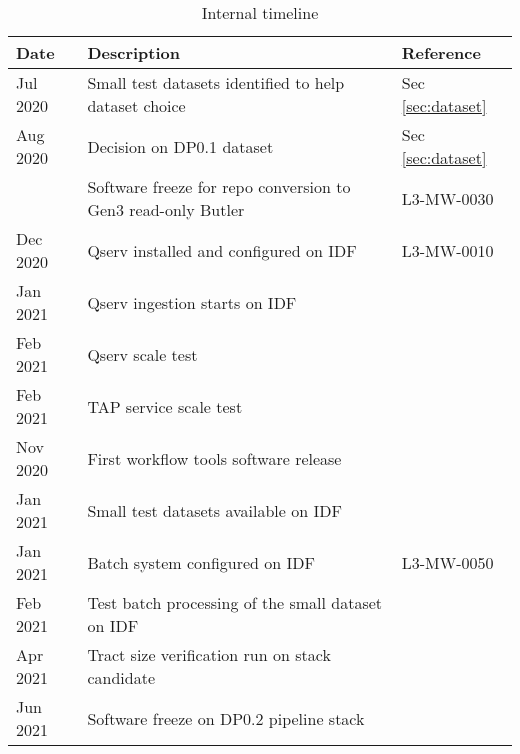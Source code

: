 \tiny \begin{longtable} {|l|l|l|} \caption{Internal timeline   \label{tab:timeline}}\\
\hline
\textbf{Date}&\textbf{Description}&\textbf{Reference}  \\ \hline

{Jul 2020}&{Small test datasets identified to help dataset choice}&{Sec \ref{sec:dataset}} \\ \hline
{Aug 2020}&{Decision on DP0.1 dataset}&{Sec \ref{sec:dataset}} \\ \hline
{}&{Software freeze for repo conversion to Gen3 read-only Butler}&{L3-MW-0030} \\ \hline
{Dec 2020}&{Qserv installed and configured on IDF}&{L3-MW-0010} \\ \hline
{Jan 2021}&{Qserv ingestion starts on IDF}&{} \\ \hline
{Feb 2021}&{Qserv scale test}&{} \\ \hline
{Feb 2021}&{TAP service scale test}&{} \\ \hline
{Nov 2020}&{First workflow tools software release}&{} \\ \hline
{Jan 2021}&{Small test datasets available on IDF}&{} \\ \hline
{Jan 2021}&{Batch system configured on IDF}&{L3-MW-0050} \\ \hline
{Feb 2021}&{Test batch processing of the small dataset on IDF}&{} \\ \hline
{Apr 2021}&{Tract size verification run on stack candidate}&{} \\ \hline
{Jun 2021}&{Software freeze on DP0.2 pipeline stack}&{} \\ \hline
\end{longtable} \normalsize
